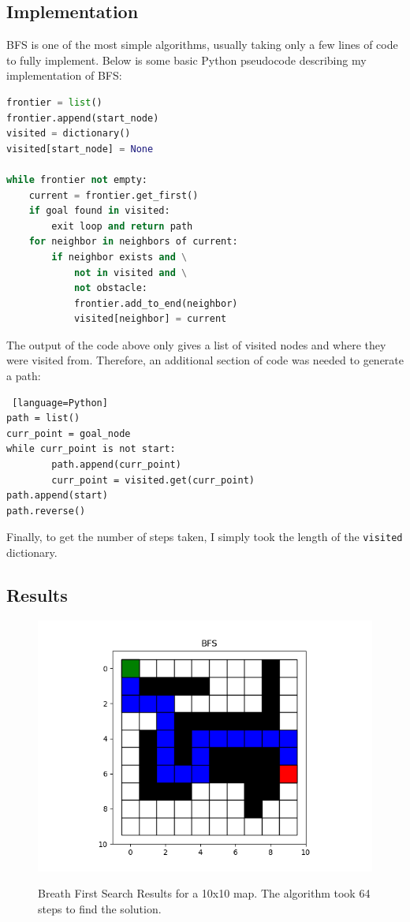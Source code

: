 \documentclass[journal]{IEEEtran}
\begin{document}
    \subsection{Implementation}
    BFS is one of the most simple algorithms, usually taking only a few lines of code to fully implement. Below is some basic Python pseudocode describing my implementation of BFS: \cite{RedBlobGames_a*}

    \begin{lstlisting}[language=Python]
frontier = list()
frontier.append(start_node)
visited = dictionary()
visited[start_node] = None

while frontier not empty:
    current = frontier.get_first()
    if goal found in visited:
        exit loop and return path
    for neighbor in neighbors of current:
        if neighbor exists and \
            not in visited and \
            not obstacle:
            frontier.add_to_end(neighbor)
            visited[neighbor] = current
    \end{lstlisting}

    The output of the code above only gives a list of visited nodes and where they were visited from. Therefore, an additional section of code was needed to generate a path:

    \begin{lstlisting} [language=Python]
path = list()
curr_point = goal_node
while curr_point is not start:
        path.append(curr_point)
        curr_point = visited.get(curr_point)
path.append(start)
path.reverse()
    \end{lstlisting}

    Finally, to get the number of steps taken, I simply took the length of the \lstinline{visited} dictionary.

    \subsection{Results}

    \begin{figure}[ht]
        \includegraphics[width=\linewidth]{figures/BFS_LargeMap_Path.png}
        \label{fig:Dijkstra_Weights_Example}
        \caption{Breath First Search Results for a 10x10 map. The algorithm took 64 steps to find the solution.}
    \end{figure} 
\end{document}
